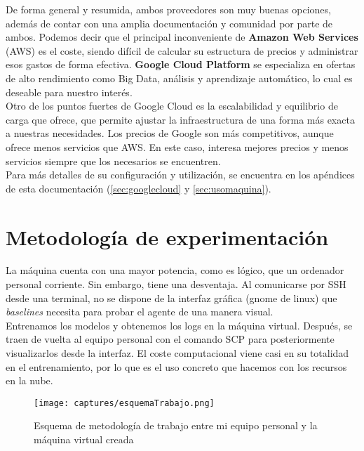 \documentclass[11pt,fleqn]{book} %
\begin{document}
De forma general y resumida, ambos proveedores son muy buenas opciones, además de contar con una amplia documentación y comunidad por parte de ambos. Podemos decir que el principal inconveniente de \textbf{Amazon Web Services} (AWS) es el coste, siendo difícil de calcular su estructura de precios y administrar esos gastos de forma efectiva. \textbf{Google Cloud Platform} se especializa en ofertas de alto rendimiento como Big Data, análisis y aprendizaje automático, lo cual es deseable para nuestro interés. \\

Otro de los puntos fuertes de Google Cloud es la escalabilidad y equilibrio de carga que ofrece, que permite ajustar la infraestructura de una forma más exacta a nuestras necesidades. Los precios de Google son más competitivos, aunque ofrece menos servicios que AWS. En este caso, interesa mejores precios y menos servicios siempre que los necesarios se encuentren. \\

Para más detalles de su configuración y utilización, se encuentra en los apéndices de esta documentación (\ref{sec:googlecloud} y \ref{sec:usomaquina}).

\section{Metodología de experimentación}

La máquina cuenta con una mayor potencia, como es lógico, que un ordenador personal corriente. Sin embargo, tiene una desventaja. Al comunicarse por SSH desde una terminal, no se dispone de la interfaz gráfica (gnome de linux) que \textit{baselines} necesita para probar el agente de una manera visual. \\

Entrenamos los modelos y obtenemos los logs en la máquina virtual. Después, se traen de vuelta al equipo personal con el comando SCP para posteriormente visualizarlos desde la interfaz. El coste computacional viene casi en su totalidad en el entrenamiento, por lo que es el uso concreto que hacemos con los recursos en la nube.

\begin{figure}[H]
	\centering\texttt{[image: captures/esquemaTrabajo.png]}
	\caption{Esquema de metodología de trabajo entre mi equipo personal y la máquina virtual creada}
	\label{fig:formaTrabajo} %
\end{figure}
\end{document}
